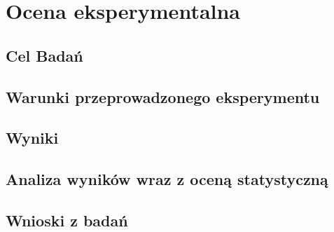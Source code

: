 \chapter{Ocena eksperymentalna}

\section{Cel Badań}

\section{Warunki przeprowadzonego eksperymentu}

\section{Wyniki}

\section{Analiza wyników wraz z oceną statystyczną}

\section{Wnioski z badań}

